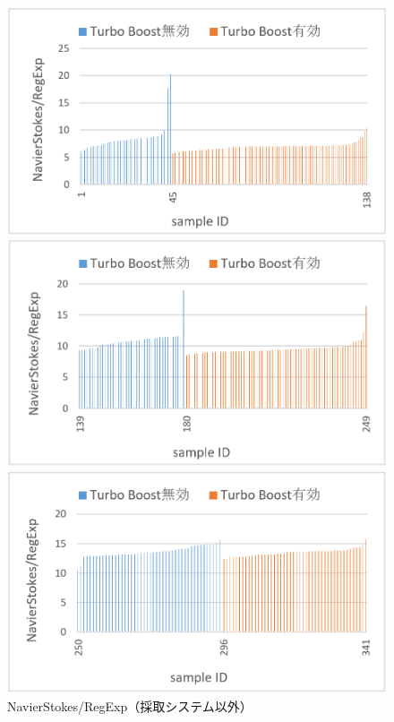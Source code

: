 \begin{figure}[H]
  \begin{minipage}[b]{0.45\linewidth}
    \centering
    \includegraphics[width=\textwidth,pagebox=cropbox]{fig/turbo_rst_chrome.png}
  \end{minipage}
  \begin{minipage}[b]{0.45\linewidth}
    \centering
    \includegraphics[width=\textwidth,pagebox=cropbox]{fig/turbo_rst_firefox.png}
  \end{minipage}
  \begin{minipage}[b]{0.45\linewidth}
    \centering
    \includegraphics[width=\textwidth,pagebox=cropbox]{fig/turbo_rst_ie.png}
  \end{minipage}
  \caption{NavierStokes/RegExp（採取システム以外）}\label{fig-turbo_rst}
\end{figure}


